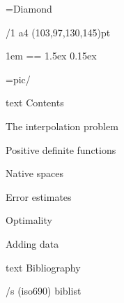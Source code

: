 \useOpTeX  %


\hyperlinks \Black \Black
{}

\enlang
\fontfam[GaramondMT]\let\semibold\bf \typosize[12/14.1818]

\font\symbols=Diamond %
\def\QED{\hbox{\symbols\resizethefont \,❖}}


\margins/1 a4 (103,97,130,145)pt


\parindent 1em
\iindent=\parindent \ttindent=\parindent
\parskip 1.5ex
 0.15ex

\picdir={pic/}


\bgroup
\let\_mtext\ignoreit
\nonum\notoc\chap Contents
\egroup
\tocpage


\sec The interpolation problem


\sec Positive definite functions


\sec Native spaces


\sec[errorsec] Error estimates


\sec Optimality


\sec[addingsec] Adding data







\bgroup
\let\_mtext\ignoreit
\nonum\chap Bibliography

\def\_opwarning#1{}
\usebib/s (iso690) biblist
\egroup

\bye
